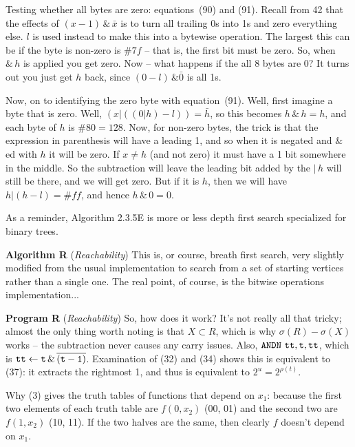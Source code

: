  Testing whether all bytes are zero: 
equations~(90) and (91). \hfil\break 
Recall from 42 that the effects of $\left(x - 1\right) \, \& \, \bar x$
is to turn all trailing 0s into 1s and zero everything else.  $l$
is used instead to make this into a bytewise operation.  The
largest this can be if the byte is non-zero is $\#7f$ -- that is, the 
first bit must be zero. So, when $\& \, h$ is applied you get zero.
Now -- what happens if the all 8 bytes are 0?  It turns out you
just get $h$ back, since $\left(0 - l\right) \, \& \bar 0$ is all 1s.

Now, on to identifying the zero byte with equation~(91).
Well, first imagine a byte that is zero.  Well,
$\left(x | \left(\left(0 | h\right) - l \right)\right) = \bar h$,
so this becomes $h \, \& \, h = h$, and each byte of $h$
is $\#80 = 128$.  Now, for non-zero bytes, the trick
is that the expression in parenthesis will have a leading 1,
and so when it is negated and $\&$ed with $h$ it will be zero.
If $x \neq h$ (and not zero) it must have a 1 bit somewhere
in the middle.  So the subtraction will leave the leading bit
added by the $|\,h$ will still be there, and we will get zero.
But if it is $h$, then we will have $h | \left(h - l\right) = \#ff$,
and hence $h \, \& \,0 = 0$.


\noindent [p 159] As a reminder, Algorithm 2.3.5E is more or
less depth first search specialized for binary trees.

 {\bf Algorithm R} ({\it Reachability})\hfil\break
This is, or course, breath first search, very slightly modified from
the usual implementation to search from a set of starting vertices
rather than a single one.  The real point, of course, is the bitwise
operations implementation...

 {\bf Program R} ({\it Reachability})\hfil\break
So, how does it work?  It's not really all that tricky; almost the only
thing worth noting is that $X \subset R$, which is why $\sigma\left(R\right) -
\sigma\left(X\right)$ works -- the subtraction never causes any carry issues.
Also, ${\tt ANDN\ tt,t,tt}$, which is ${\tt tt} \gets {\tt t \, \& \, \overline{\left( t - 1 \right)}}$.
Examination of (32) and (34) shows this is equivalent to (37): it extracts the
rightmost 1, and thus is equivalent to $2^u = 2^{\rho\left(t\right)}$.


\noindent [p 204] Why (3) gives the truth tables of functions that
depend on $x_1$: because the first two elements of each truth table
are $f\left(0, x_2\right)$ (00, 01) and the second two are $f\left(1, x_2\right)$
(10, 11).  If the two halves are the same, then clearly $f$ doesn't
depend on $x_1$.

